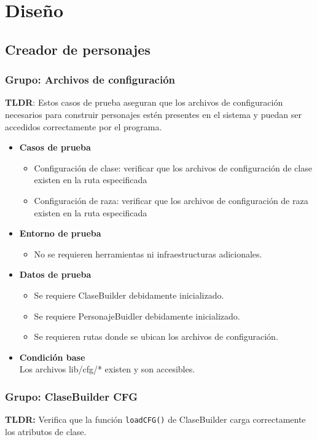 \documentclass{article}
\begin{document}
\newpage
\section{Diseño}
\subsection{Creador de personajes}
\subsubsection{Grupo: Archivos de configuración}
\textbf{TLDR}:
Estos casos de prueba aseguran que los archivos de configuración necesarios para construir personajes estén presentes en el sistema y puedan ser accedidos correctamente por el programa.

\begin{itemize}
	\item \textbf{Casos de prueba}
	\begin{itemize}
		\item Configuración de clase: verificar que los archivos de configuración de clase existen en la ruta especificada
		\item Configuración de raza: verificar que los archivos de configuración de raza existen en la ruta especificada
	\end{itemize}
	\item \textbf{Entorno de prueba}
        \begin{itemize}
		\item No se requieren herramientas ni infraestructuras adicionales.
	\end{itemize}

	\item \textbf{Datos de prueba}
	\begin{itemize}
		\item 	Se requiere ClaseBuilder debidamente inicializado.
			\item Se requiere PersonajeBuidler debidamente inicializado.
			\item Se requieren rutas donde se ubican los archivos de configuración.
	\end{itemize}

	
	\item \textbf{Condición base}\\
	Los archivos lib/cfg/* existen y son accesibles. 
\end{itemize}


\subsubsection{Grupo: ClaseBuilder CFG}
\textbf{TLDR:} Verifica que la función \texttt{loadCFG()} de ClaseBuilder carga correctamente los atributos de clase.
\end{document}
